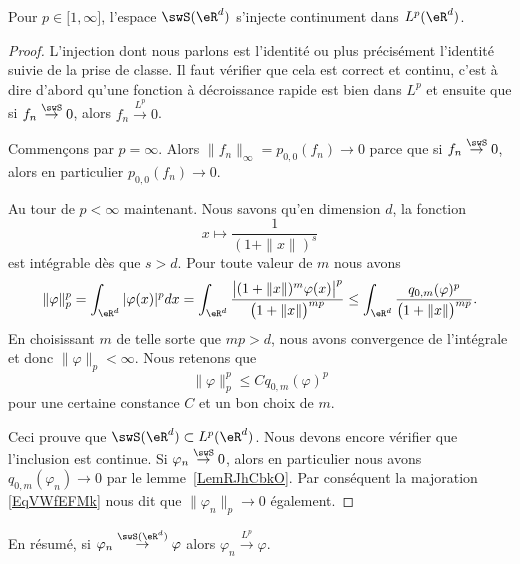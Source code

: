 \begin{proposition}     \label{PropGNXBeME}
    Pour \( p\in\mathopen[ 1 , \infty \mathclose]\), l'espace \( \swS(\eR^d)\) s'injecte continument dans \( L^p(\eR^d)\).
\end{proposition}

\begin{proof}
    L'injection dont nous parlons est l'identité ou plus précisément l'identité suivie de la prise de classe. Il faut vérifier que cela est correct et continu, c'est à dire d'abord qu'une fonction à décroissance rapide est bien dans \( L^p\) et ensuite que si \( f_n\stackrel{\swS}{\to}0\), alors \( f_n\stackrel{L^p}{\to}0\).

    Commençons par \( p=\infty\). Alors \( \| f_n \|_{\infty}=p_{0,0}(f_n)\to 0\) parce que si \( f_n\stackrel{\swS}{\to}0\), alors en particulier \( p_{0,0}(f_n)\to 0\).

    Au tour de \( p<\infty\) maintenant. Nous savons qu'en dimension \( d\), la fonction
    \begin{equation}
        x\mapsto \frac{1}{ (1+\| x \|)^s }
    \end{equation}
    est intégrable dès que \( s>d\).
    Pour toute valeur de \( m\) nous avons
    \begin{equation}
        \| \varphi \|_p^p=\int_{\eR^d}| \varphi(x) |^pdx=\int_{\eR^d}\frac{ \big|    (1+\| x \|)^m\varphi(x)   \big|^p }{ \big( 1+\| x \| \big)^{mp} }\leq\int_{\eR^d}\frac{q_{0,m}(\varphi)^p}{ \big( 1+\| x \| \big)^{mp} }.
    \end{equation}
    En choisissant \( m\) de telle sorte que \( mp>d\), nous avons convergence de l'intégrale et donc \( \| \varphi \|_p<\infty\). Nous retenons que
    \begin{equation}    \label{EqVWfEFMk}
        \| \varphi \|_p^p\leq Cq_{0,m}(\varphi)^p
    \end{equation}
    pour une certaine constance \( C\) et un bon choix de \( m\).

    Ceci prouve que \( \swS(\eR^d)\subset L^p(\eR^d)\). Nous devons encore vérifier que l'inclusion est continue. Si \( \varphi_n\stackrel{\swS}{\to}0\), alors en particulier nous avons \( q_{0,m}(\varphi_n)\to 0\) par le lemme~\ref{LemRJhCbkO}. Par conséquent la majoration \eqref{EqVWfEFMk} nous dit que \( \| \varphi_n \|_p\to 0\) également.

\end{proof}
En résumé, si \( \varphi_n\stackrel{\swS(\eR^d)}{\to}\varphi\) alors \( \varphi_n\stackrel{L^p}{\to}\varphi\).

